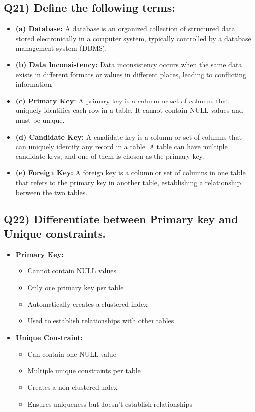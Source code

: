 \documentclass{article}
\begin{document}
\subsection*{Q21) Define the following terms:}
\begin{itemize}
\item \textbf{(a) Database:} A database is an organized collection of structured data stored electronically in a computer system, typically controlled by a database management system (DBMS).

\item \textbf{(b) Data Inconsistency:} Data inconsistency occurs when the same data exists in different formats or values in different places, leading to conflicting information.

\item \textbf{(c) Primary Key:} A primary key is a column or set of columns that uniquely identifies each row in a table. It cannot contain NULL values and must be unique.

\item \textbf{(d) Candidate Key:} A candidate key is a column or set of columns that can uniquely identify any record in a table. A table can have multiple candidate keys, and one of them is chosen as the primary key.

\item \textbf{(e) Foreign Key:} A foreign key is a column or set of columns in one table that refers to the primary key in another table, establishing a relationship between the two tables.
\end{itemize}

\subsection*{Q22) Differentiate between Primary key and Unique constraints.}
\begin{itemize}
\item \textbf{Primary Key:}
\begin{itemize}
\item Cannot contain NULL values
\item Only one primary key per table
\item Automatically creates a clustered index
\item Used to establish relationships with other tables
\end{itemize}

\item \textbf{Unique Constraint:}
\begin{itemize}
\item Can contain one NULL value
\item Multiple unique constraints per table
\item Creates a non-clustered index
\item Ensures uniqueness but doesn't establish relationships
\end{itemize}
\end{itemize}
\end{document}

